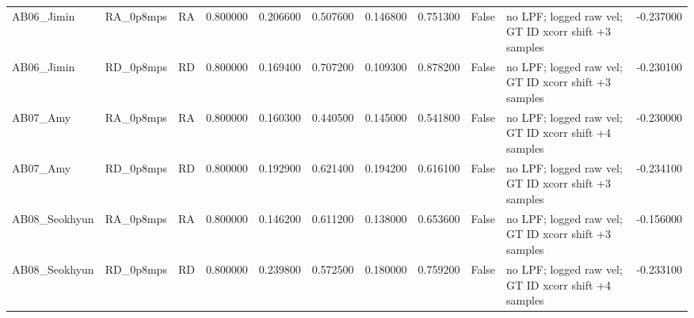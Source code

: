 \begin{table}
\begin{tabular}{lllrrrrrrlr}
AB06\_Jimin & RA\_0p8mps & RA & 0.800000 & 0.206600 & 0.507600 & 0.146800 & 0.751300 & False & no LPF; logged raw vel; GT ID xcorr shift +3 samples & -0.237000 \\
AB06\_Jimin & RD\_0p8mps & RD & 0.800000 & 0.169400 & 0.707200 & 0.109300 & 0.878200 & False & no LPF; logged raw vel; GT ID xcorr shift +3 samples & -0.230100 \\
AB07\_Amy & RA\_0p8mps & RA & 0.800000 & 0.160300 & 0.440500 & 0.145000 & 0.541800 & False & no LPF; logged raw vel; GT ID xcorr shift +4 samples & -0.230000 \\
AB07\_Amy & RD\_0p8mps & RD & 0.800000 & 0.192900 & 0.621400 & 0.194200 & 0.616100 & False & no LPF; logged raw vel; GT ID xcorr shift +3 samples & -0.234100 \\
AB08\_Seokhyun & RA\_0p8mps & RA & 0.800000 & 0.146200 & 0.611200 & 0.138000 & 0.653600 & False & no LPF; logged raw vel; GT ID xcorr shift +3 samples & -0.156000 \\
AB08\_Seokhyun & RD\_0p8mps & RD & 0.800000 & 0.239800 & 0.572500 & 0.180000 & 0.759200 & False & no LPF; logged raw vel; GT ID xcorr shift +4 samples & -0.233100 \\
\bottomrule
\end{tabular}
\end{table}
